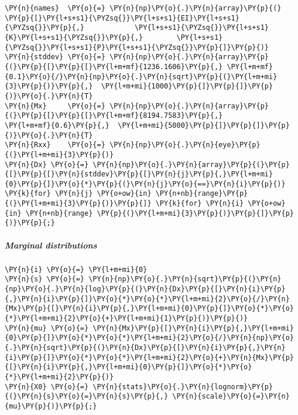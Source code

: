     \begin{tcolorbox}[breakable, size=fbox, boxrule=1pt, pad at break*=1mm,colback=cellbackground, colframe=cellborder]
\begin{Verbatim}[commandchars=\\\{\}]
\PY{n}{names}  \PY{o}{=} \PY{n}{np}\PY{o}{.}\PY{n}{array}\PY{p}{(} \PY{p}{[}\PY{l+s+s1}{\PYZsq{}}\PY{l+s+s1}{EI}\PY{l+s+s1}{\PYZsq{}}\PY{p}{,}            \PY{l+s+s1}{\PYZsq{}}\PY{l+s+s1}{K}\PY{l+s+s1}{\PYZsq{}}\PY{p}{,}        \PY{l+s+s1}{\PYZsq{}}\PY{l+s+s1}{P}\PY{l+s+s1}{\PYZsq{}}\PY{p}{]}\PY{p}{)}
\PY{n}{stddev} \PY{o}{=} \PY{n}{np}\PY{o}{.}\PY{n}{array}\PY{p}{(}\PY{p}{[}\PY{p}{[}\PY{l+m+mf}{1236.1606}\PY{p}{,} \PY{l+m+mf}{0.1}\PY{o}{/}\PY{n}{np}\PY{o}{.}\PY{n}{sqrt}\PY{p}{(}\PY{l+m+mi}{3}\PY{p}{)}\PY{p}{,}  \PY{l+m+mi}{1000}\PY{p}{]}\PY{p}{]}\PY{p}{)}\PY{o}{.}\PY{n}{T}
\PY{n}{Mx}     \PY{o}{=} \PY{n}{np}\PY{o}{.}\PY{n}{array}\PY{p}{(}\PY{p}{[}\PY{p}{[}\PY{l+m+mf}{8194.7583}\PY{p}{,}            \PY{l+m+mf}{0.6}\PY{p}{,}  \PY{l+m+mi}{5000}\PY{p}{]}\PY{p}{]}\PY{p}{)}\PY{o}{.}\PY{n}{T}
\PY{n}{Rxx}    \PY{o}{=} \PY{n}{np}\PY{o}{.}\PY{n}{eye}\PY{p}{(}\PY{l+m+mi}{3}\PY{p}{)}
\PY{n}{Dx} \PY{o}{=} \PY{n}{np}\PY{o}{.}\PY{n}{array}\PY{p}{(}\PY{p}{[}\PY{p}{[}\PY{n}{stddev}\PY{p}{[}\PY{n}{j}\PY{p}{,}\PY{l+m+mi}{0}\PY{p}{]}\PY{o}{*}\PY{p}{(}\PY{n}{j}\PY{o}{==}\PY{n}{i}\PY{p}{)} \PY{k}{for} \PY{n}{j} \PY{o+ow}{in} \PY{n+nb}{range}\PY{p}{(}\PY{l+m+mi}{3}\PY{p}{)}\PY{p}{]} \PY{k}{for} \PY{n}{i} \PY{o+ow}{in} \PY{n+nb}{range} \PY{p}{(}\PY{l+m+mi}{3}\PY{p}{)}\PY{p}{]}\PY{p}{)}\PY{p}{;}
\end{Verbatim}
\end{tcolorbox}

    \hypertarget{marginal-distributions}{%
\subparagraph{Marginal distributions}\label{marginal-distributions}}

    \begin{tcolorbox}[breakable, size=fbox, boxrule=1pt, pad at break*=1mm,colback=cellbackground, colframe=cellborder]
\begin{Verbatim}[commandchars=\\\{\}]
\PY{n}{i} \PY{o}{=} \PY{l+m+mi}{0}
\PY{n}{s} \PY{o}{=} \PY{n}{np}\PY{o}{.}\PY{n}{sqrt}\PY{p}{(}\PY{n}{np}\PY{o}{.}\PY{n}{log}\PY{p}{(}\PY{n}{Dx}\PY{p}{[}\PY{n}{i}\PY{p}{,}\PY{n}{i}\PY{p}{]}\PY{o}{*}\PY{o}{*}\PY{l+m+mi}{2}\PY{o}{/}\PY{n}{Mx}\PY{p}{[}\PY{n}{i}\PY{p}{,}\PY{l+m+mi}{0}\PY{p}{]}\PY{o}{*}\PY{o}{*}\PY{l+m+mi}{2}\PY{o}{+}\PY{l+m+mi}{1}\PY{p}{)}\PY{p}{)}
\PY{n}{mu} \PY{o}{=} \PY{n}{Mx}\PY{p}{[}\PY{n}{i}\PY{p}{,}\PY{l+m+mi}{0}\PY{p}{]}\PY{o}{*}\PY{o}{*}\PY{l+m+mi}{2}\PY{o}{/}\PY{n}{np}\PY{o}{.}\PY{n}{sqrt}\PY{p}{(}\PY{n}{Dx}\PY{p}{[}\PY{n}{i}\PY{p}{,}\PY{n}{i}\PY{p}{]}\PY{o}{*}\PY{o}{*}\PY{l+m+mi}{2}\PY{o}{+}\PY{n}{Mx}\PY{p}{[}\PY{n}{i}\PY{p}{,}\PY{l+m+mi}{0}\PY{p}{]}\PY{o}{*}\PY{o}{*}\PY{l+m+mi}{2}\PY{p}{)}
\PY{n}{X0} \PY{o}{=} \PY{n}{stats}\PY{o}{.}\PY{n}{lognorm}\PY{p}{(}\PY{n}{s}\PY{o}{=}\PY{n}{s}\PY{p}{,} \PY{n}{scale}\PY{o}{=}\PY{n}{mu}\PY{p}{)}\PY{p}{;}
\end{Verbatim}
\end{tcolorbox}

